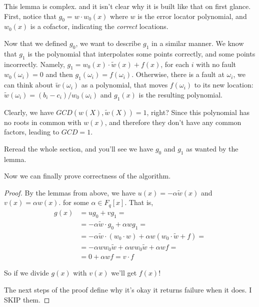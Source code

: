 This lemma is complex. and it isn't clear why it is built like that on first glance. 
First, notice that $g_0=w\cdot w_0(x)$ where $w$ is the error locator polynomial,
and $w_0(x)$ is a cofactor, indicating the \emph{correct} locations.

Now that we defined $g_0$, we want to describe $g_1$ 
in a similar manner. We know that $g_1$ is the polynomial that interpolates
some points correctly, and some points incorrectly.
Namely, $g_1=w_0(x)\cdot \tilde{w}(x)+f(x)$, for each $i$ with no fault $w_0(\omega_i)=0$
and then $g_1(\omega_i)=f(\omega_i)$. Otherwise, there is a fault at $\omega_i$, 
we can think about $\tilde{w}(\omega_i)$ as a polynomial,
that moves $f(\omega_i)$ to its new location:
$\tilde{w}(\omega_i)=(b_i-c_i)/w_0(\omega_i)$ and $g_1(x)$ is the resulting polynomial.

Clearly, we have $GCD(w(X),\tilde{w}(X))=1$, right? 
Since this polynomial has no roots in common with 
$w(x)$, and therefore they don't have any common
 factors, leading to $GCD=1$.

Reread the whole section, and you'll see we have $g_0$ and $g_1$ as wanted by the lemma.

Now we can finally prove correctness of the algorithm.
\begin{proof}
By the lemmas from above, we have 
$u(x)=-\alpha\tilde{w}(x)$ and $v(x)=\alpha w(x)$. for some $\alpha\in F_q[x]$.
That is, 
\begin{equation}
    \begin{split}
    g(x) & = u g_0+vg_1= \\
         & = -\alpha\tilde{w}\cdot g_0 + \alpha w g_1= \\
         & = -\alpha\tilde{w}\cdot (w_0 \cdot w) + \alpha w (w_0 \cdot \tilde{w}+f) = \\
         & = -\alpha w w_0 \tilde{w} + \alpha w w_0 \tilde{w} + \alpha w f = \\
         & = 0 + \alpha w f = v\cdot f
    \end{split}
\end{equation}

So if we divide $g(x)$ with $v(x)$ we'll get $f(x)$!

The next steps of the proof define why it's okay it returns failure when it does.
I SKIP them.
\end{proof}

